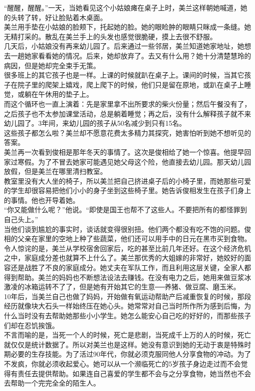 “醒醒，醒醒。”一天，当她看见这个小姑娘瘫在桌子上时，美兰这样朝她喊道，她的头转了转，好让脸贴着木桌面。\\

美兰用手垫在小姑娘的脸颊下，托起她的脸。她的眼睑肿的眼睛只眯成一条缝。她无精打采的。散乱在美兰手上的头发也感觉很脆硬，摸上去很不舒服。\\

几天后，小姑娘没有再来幼儿园了。后来通过一些邻居，美兰知道她家地址，她想去一趟她家看看她的情况。后来，她却放弃了。去又有什么用？她十分清楚慧玲的病因，但是她却完全束手无策。\\

很多班上的其它孩子也是一样。上课的时候就趴在桌子上。课间的时候，当其它孩子在院子里的爬架上嬉戏，爬上爬下的时候，他们只是留在原地，或趴在桌子上睡觉，或躺在午休用的垫子上。\\

而这个循环也一直上演着：先是家里拿不出所要求的柴火份量；然后午餐没有了，之后孩子也不太参加课堂活动，总是躺着睡觉；再之后，没有什么解释孩子就不来幼儿园了。3年间，来幼儿园的孩子从50名减少到只有15名。\\

这些孩子都怎么啦？美兰却不愿意花费太多精力其探究，她害怕听到她不想听见的答案。\\

美兰再一次看到俊相是那年冬天的事情了。这次是俊相给了她一个惊喜。他提早回家过寒假。为了不冒去她家可能遇见她父母这个险，他直接去幼儿园。那天幼儿园放假，但是美兰在哪里清扫教室。\\

教室里没有大人坐的椅子，所以美兰把自己挤进桌子后的小椅子里，而她那些可爱的学生却很容易把他们小小的身子坐到这些椅子里。她告诉俊相发生在孩子们身上的事情。他也开导着她。\\

“你又能做什么呢？”他说。“即使是国王也帮不了这些人。不要把所有的都怪罪到自己头上。”\\

当他们谈到尴尬的事实时，谈话就变得很别扭。他们两个都没有吃不饱的问题。俊相的父亲在家里的空地上种了些蔬菜，他们还可以用手中的日元在黑市买到食物。令人惊诧的是，美兰从学校宿舍回家后，吃的甚至比前几年还好。在这个经济危机之中，家庭成分差也就算不上什么了。美兰那优秀的大姐嫁的非常好，她姣好的面容还是战胜了不良的家庭成分。她丈夫在军队工作，而且利用这层关键，全家人都得到帮助。美兰的妈妈也不断想法设法去赚钱。在没有电力之后，她用来做豆浆冰激凌的冰箱运转不了了，但是她有开始其它的生意──养猪、做豆腐、磨玉米。\\

10年后，当美兰自己也做了妈妈，开始做有氧运动帮助产后减重恢复的时候，那段经历就像块大石头一样始终压在她心头。她常常对自己当时所作所为感到后悔，为什么当时没有去帮助她那些小小学生。她怎么能安心自己吃的好好的，而那些孩子们却在忍饥挨饿。\\

不言而喻的是，当死一个人的时候，死亡是悲剧，当死成千上万的人的时候，死亡就仅仅是统计数据了。所以对美兰也是这样。她没有意识到她的无动于衷是特殊时期必要的生存技能。为了活过90年代，你就必须克服同他人分享食物的冲动。为了不发疯，你就必须收起爱心。她可以从一个濒临死亡的5岁孩子身边走过而不会觉得有责任去提供帮助。如果连自己喜爱的学生都不会与之分享食物，她当然也不会去帮助一个完完全全的陌生人。\\
